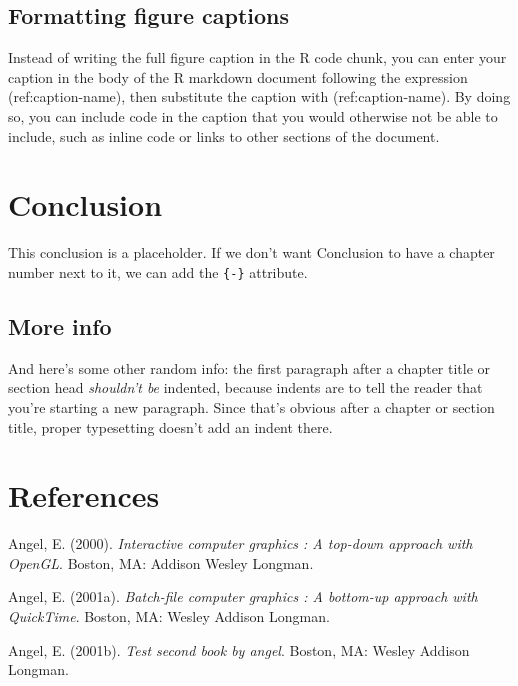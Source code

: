 \documentclass[12pt, oneside]{queensuthesis}
\numberwithin{equation}{chapter}       %
\newlength{\cslhangindent}
\newenvironment{CSLReferences}[2] %
 {%
  \setlength{\parindent}{0pt}
  \ifodd #1 \everypar{\setlength{\hangindent}{\cslhangindent}}\ignorespaces\fi
  \ifnum #2 > 0
  \setlength{\parskip}{#2\baselineskip}
  \fi
 }%
 {}
\begin{document}
\hypertarget{formatting-figure-captions}{%
\section{Formatting figure captions}\label{formatting-figure-captions}}

Instead of writing the full figure caption in the R code chunk, you can enter
your caption in the body of the R markdown document following the expression
(ref:caption-name), then substitute the caption with (ref:caption-name). By
doing so, you can include code in the caption that you would otherwise not be
able to include, such as inline code or links to other sections of the document.

\hypertarget{conclusion}{%
\chapter*{Conclusion}\label{conclusion}}

This conclusion is a placeholder. If we don't want Conclusion to have a chapter number next to it, we can add the \texttt{\{-\}} attribute.

\hypertarget{more-info}{%
\section{More info}\label{more-info}}

And here's some other random info: the first paragraph after a chapter title or section head \emph{shouldn't be} indented, because indents are to tell the reader that you're starting a new paragraph. Since that's obvious after a chapter or section title, proper typesetting doesn't add an indent there.

\hypertarget{references}{%
\chapter*{References}\label{references}}


\setlength{\parskip}{8pt}

\hypertarget{refs}{}
\begin{CSLReferences}{1}{0}
\leavevmode{}%
Angel, E. (2000). \emph{Interactive computer graphics : A top-down approach with OpenGL}. Boston, MA: Addison Wesley Longman.

\leavevmode{}%
Angel, E. (2001a). \emph{Batch-file computer graphics : A bottom-up approach with QuickTime}. Boston, MA: Wesley Addison Longman.

\leavevmode{}%
Angel, E. (2001b). \emph{Test second book by angel}. Boston, MA: Wesley Addison Longman.

\end{CSLReferences}
\appendix
\end{document}
